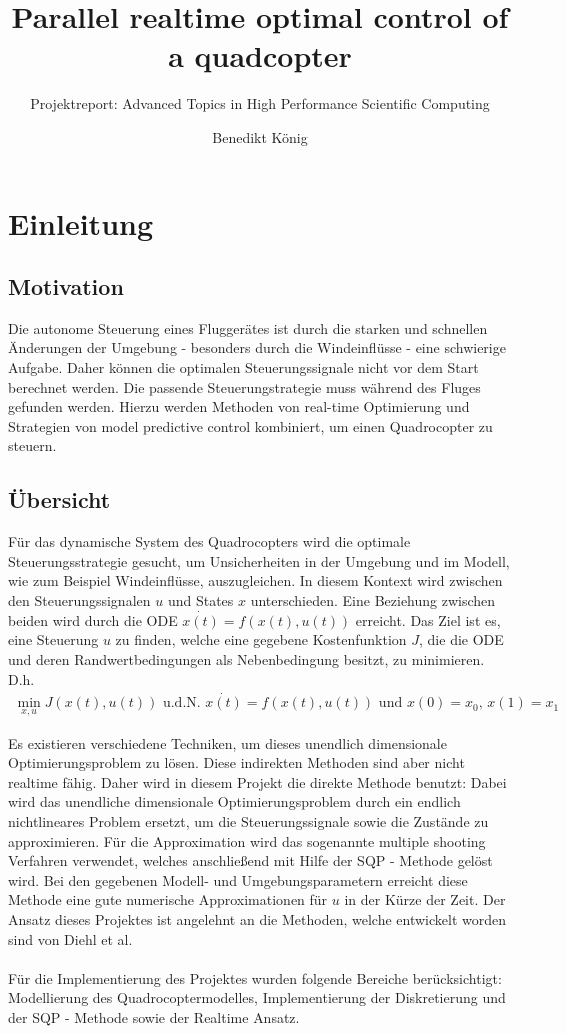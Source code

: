 \documentclass{scrartcl}
\title{\vspace{-2cm}Parallel realtime optimal control of a quadcopter}
\subtitle{Projektreport: Advanced Topics in High Performance Scientific Computing}
\author{Benedikt König}
\begin{document}
\maketitle

\section{Einleitung}
\subsection{Motivation}
Die autonome Steuerung eines Fluggerätes ist durch die starken und schnellen Änderungen der Umgebung - besonders durch die Windeinflüsse - eine schwierige Aufgabe. Daher können die optimalen Steuerungssignale nicht vor dem Start berechnet werden. Die passende Steuerungstrategie muss während des Fluges gefunden werden. Hierzu werden Methoden von real-time Optimierung und Strategien von model predictive control kombiniert, um einen Quadrocopter zu steuern.  

\subsection{Übersicht}
Für das dynamische System des Quadrocopters wird die optimale Steuerungsstrategie gesucht, um Unsicherheiten in der Umgebung und im Modell, wie zum Beispiel Windeinflüsse, auszugleichen. In diesem Kontext wird zwischen den Steuerungssignalen $u$ und States $x$ unterschieden. Eine Beziehung zwischen beiden wird durch die ODE $\dot{x(t)}=f(x(t), u(t))$ erreicht. Das Ziel ist es, eine Steuerung $u$ zu finden, welche eine gegebene Kostenfunktion $J$, die die ODE und deren Randwertbedingungen als Nebenbedingung besitzt, zu minimieren. D.h.
\begin{align}
	\min_{x, u} J(x(t), u(t)) \text{ u.d.N. } \dot{x(t)} = f(x(t), u(t)) \text{ und } x(0) = x_0\text{, } x(1) = x_1
\end{align}

Es existieren verschiedene Techniken, um dieses unendlich dimensionale Optimierungsproblem zu lösen. Diese indirekten Methoden sind aber nicht realtime fähig. Daher wird in diesem Projekt die direkte Methode benutzt: Dabei wird das unendliche dimensionale Optimierungsproblem durch ein endlich nichtlineares Problem ersetzt, um die Steuerungssignale sowie die Zustände zu approximieren. Für die Approximation wird das sogenannte multiple shooting Verfahren verwendet, welches anschließend mit Hilfe der SQP - Methode gelöst wird. Bei den gegebenen Modell- und Umgebungsparametern erreicht diese Methode eine gute numerische Approximationen für $u$ in der Kürze der Zeit. Der Ansatz dieses Projektes ist angelehnt an die Methoden, welche entwickelt worden sind von Diehl et al. \cite{Diehl2001, Diehl2002}\\
\\
Für die Implementierung des Projektes wurden folgende Bereiche berücksichtigt: Modellierung des Quadrocoptermodelles, Implementierung der Diskretierung und der SQP - Methode sowie der Realtime Ansatz.
\end{document}
